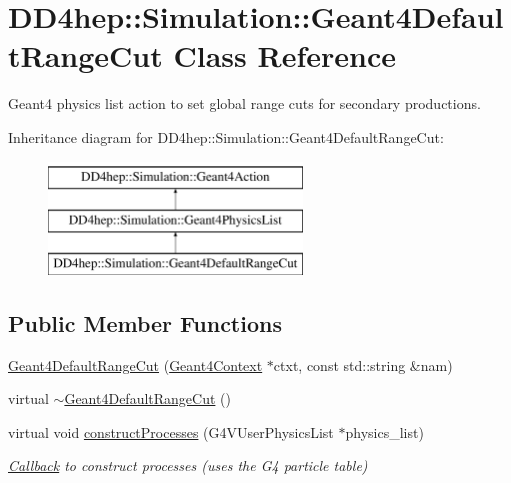 \hypertarget{class_d_d4hep_1_1_simulation_1_1_geant4_default_range_cut}{}\section{D\+D4hep\+:\+:Simulation\+:\+:Geant4\+Default\+Range\+Cut Class Reference}
\label{class_d_d4hep_1_1_simulation_1_1_geant4_default_range_cut}


Geant4 physics list action to set global range cuts for secondary productions.  


Inheritance diagram for D\+D4hep\+:\+:Simulation\+:\+:Geant4\+Default\+Range\+Cut\+:\begin{figure}[H]
\begin{center}
\leavevmode
\includegraphics[height=3.000000cm]{class_d_d4hep_1_1_simulation_1_1_geant4_default_range_cut}
\end{center}
\end{figure}
\subsection*{Public Member Functions}
\begin{DoxyCompactItemize}
\item 
\hyperlink{class_d_d4hep_1_1_simulation_1_1_geant4_default_range_cut_ab3e4d2b49a9aab9f42d04f5c73f7e5b4}{Geant4\+Default\+Range\+Cut} (\hyperlink{class_d_d4hep_1_1_simulation_1_1_geant4_context}{Geant4\+Context} $\ast$ctxt, const std\+::string \&nam)
\item 
virtual \hyperlink{class_d_d4hep_1_1_simulation_1_1_geant4_default_range_cut_a32d4c8eb8988913c4ed1c8ad6e2ab893}{$\sim$\+Geant4\+Default\+Range\+Cut} ()
\item 
virtual void \hyperlink{class_d_d4hep_1_1_simulation_1_1_geant4_default_range_cut_a5625f1bf8f0c47bb6b29c73ce3e590eb}{construct\+Processes} (G4\+V\+User\+Physics\+List $\ast$physics\+\_\+list)
\begin{DoxyCompactList}\small\item\em \hyperlink{class_d_d4hep_1_1_callback}{Callback} to construct processes (uses the G4 particle table) \end{DoxyCompactList}\end{DoxyCompactItemize}
